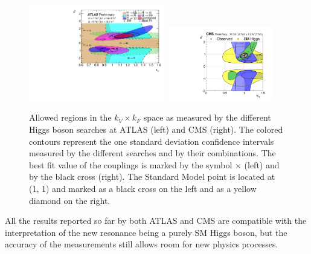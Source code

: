 \begin{figure}
        \centering
	\includegraphics[width=0.53\textwidth]{1_Introduction_Th_and_Exp/pics/fig_05b.pdf}
	\includegraphics[width=0.41\textwidth]{1_Introduction_Th_and_Exp/pics/cVcF_all_channels_2quadrant.pdf}
       \caption{Allowed regions in the $k_V \times k_F$ space as measured by the different Higgs boson searches at ATLAS (left) and CMS (right). The colored contours represent the one standard deviation confidence intervals measured by the different searches and by their combinations. The best fit value of the couplings is marked by the symbol $\times$ (left) and by the black cross (right). The Standard Model point is located at (1, 1) and marked as a black cross on the left and as a yellow diamond on the right. }
       \label{fig:kvf}
\end{figure}

All the results reported so far by both ATLAS and CMS are compatible with the interpretation of the new resonance being a purely SM Higgs boson, but the accuracy of the measurements still allows room for new physics processes.



